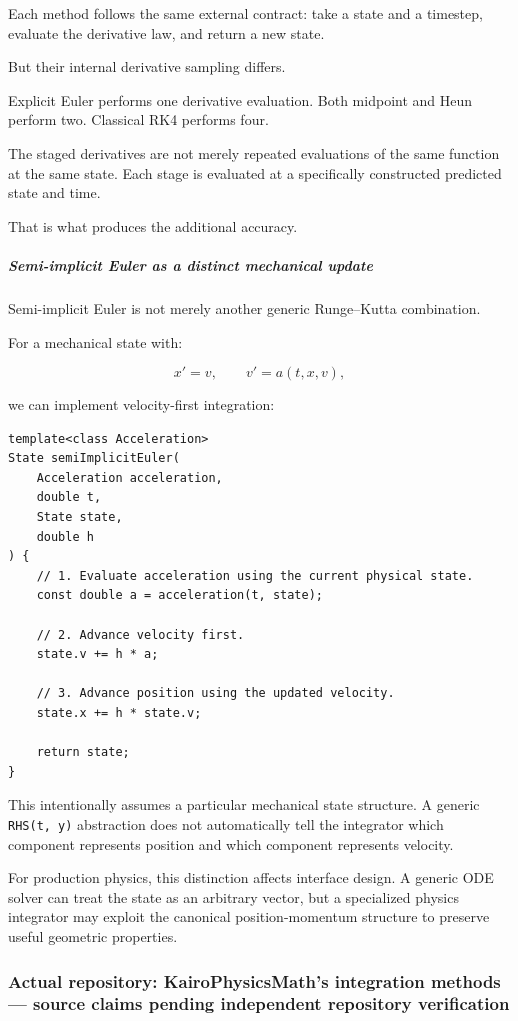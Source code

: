 Each method follows the same external contract: take a state and a timestep, evaluate the derivative law, and return a new state.

But their internal derivative sampling differs.

Explicit Euler performs one derivative evaluation. Both midpoint and Heun perform two. Classical RK4 performs four.

The staged derivatives are not merely repeated evaluations of the same function at the same state. Each stage is evaluated at a specifically constructed predicted state and time.

That is what produces the additional accuracy.

\subparagraph{Semi-implicit Euler as a distinct mechanical update}\label{02-foundations-ii-ch025-semi-implicit-euler-as-a-distinct-mechanical-update}

Semi-implicit Euler is not merely another generic Runge--Kutta combination.

For a mechanical state with:

\[
x'=v,\qquad v'=a(t,x,v),
\]

we can implement velocity-first integration:

\begin{verbatim}
template<class Acceleration>
State semiImplicitEuler(
    Acceleration acceleration,
    double t,
    State state,
    double h
) {
    // 1. Evaluate acceleration using the current physical state.
    const double a = acceleration(t, state);

    // 2. Advance velocity first.
    state.v += h * a;

    // 3. Advance position using the updated velocity.
    state.x += h * state.v;

    return state;
}
\end{verbatim}

This intentionally assumes a particular mechanical state structure. A generic \texttt{RHS(t,\ y)} abstraction does not automatically tell the integrator which component represents position and which component represents velocity.

For production physics, this distinction affects interface design. A generic ODE solver can treat the state as an arbitrary vector, but a specialized physics integrator may exploit the canonical position-momentum structure to preserve useful geometric properties.

\subsubsection{Actual repository: KairoPhysicsMath's integration methods --- source claims pending independent repository verification}\label{02-foundations-ii-ch025-actual-repository-kairophysicsmaths-integration-methods-source-claims-pending-independent-repository-verification}

